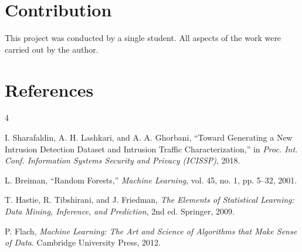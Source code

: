 \documentclass[conference]{IEEEtran}
\begin{document}
\section*{Contribution}

This project was conducted by a single student. All aspects of the work were carried out by the author.

\section{References}

\begin{thebibliography}{4}

I. Sharafaldin, A. H. Lashkari, and A. A. Ghorbani,
``Toward Generating a New Intrusion Detection Dataset and Intrusion Traffic Characterization,''
in \emph{Proc. Int. Conf. Information Systems Security and Privacy (ICISSP)}, 2018.

L. Breiman,
``Random Forests,''
\emph{Machine Learning},
vol. 45, no. 1, pp. 5--32, 2001.

T. Hastie, R. Tibshirani, and J. Friedman,
\emph{The Elements of Statistical Learning: Data Mining, Inference, and Prediction},
2nd ed. Springer, 2009.

P. Flach,
\emph{Machine Learning: The Art and Science of Algorithms that Make Sense of Data}.
Cambridge University Press, 2012.

\end{thebibliography}
\end{document}
